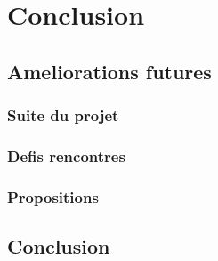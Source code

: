 \chapter{Conclusion}
        \section{Ameliorations futures}
        \subsection{Suite du projet}
        \lipsum[1]
         \subsection{Defis rencontres}
        \lipsum[1]
         \subsection{Propositions}
        \lipsum[1]
        \section{Conclusion}
        \lipsum[1]